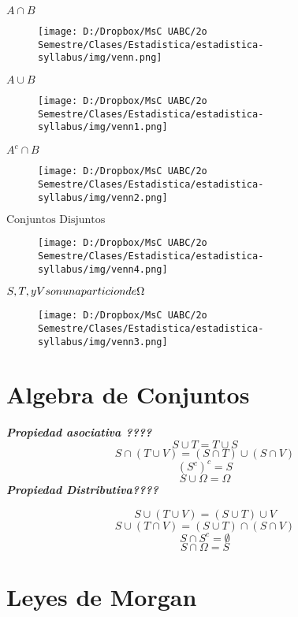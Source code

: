 \documentclass[]{book}
\begin{document}
 \(A \cap B\)

\begin{figure}[htbp]
\centering
\texttt{[image: D:/Dropbox/MsC UABC/2o Semestre/Clases/Estadistica/estadistica-syllabus/img/venn.png]}
\caption{}
\end{figure}

\(A\cup B\)

\begin{figure}[htbp]
\centering
\texttt{[image: D:/Dropbox/MsC UABC/2o Semestre/Clases/Estadistica/estadistica-syllabus/img/venn1.png]}
\caption{}
\end{figure}

\(A^c \cap B\)

\begin{figure}[htbp]
\centering
\texttt{[image: D:/Dropbox/MsC UABC/2o Semestre/Clases/Estadistica/estadistica-syllabus/img/venn2.png]}
\caption{}
\end{figure}

\(\text{Conjuntos Disjuntos}\)

\begin{figure}[htbp]
\centering
\texttt{[image: D:/Dropbox/MsC UABC/2o Semestre/Clases/Estadistica/estadistica-syllabus/img/venn4.png]}
\caption{}
\end{figure}

\(S,T,\space y \space V \space son \space una \space particion \space de \space \Omega\)

\begin{figure}[htbp]
\centering
\texttt{[image: D:/Dropbox/MsC UABC/2o Semestre/Clases/Estadistica/estadistica-syllabus/img/venn3.png]}
\caption{}
\end{figure}

\section{Algebra de Conjuntos}\label{algebra-de-conjuntos-2}

\textbf{\emph{Propiedad asociativa ????}} \[S \cup T = T \cup S\]
\[S \cap (T \cup V) = (S \cap T) \cup (S \cap V)\] \[(S^c)^c = S\]
\[S \cup \Omega = \Omega\] \textbf{\emph{Propiedad Distributiva????}}

\[S \cup (T \cup V) = (S \cup T)\cup V\]
\[S \cup (T \cap V) = (S \cup T)\cap (S \cap V)\]
\[S \cap S^c = \emptyset\] \[S \cap \Omega = S\]

\section{Leyes de Morgan}\label{leyes-de-morgan-2}
\end{document}
